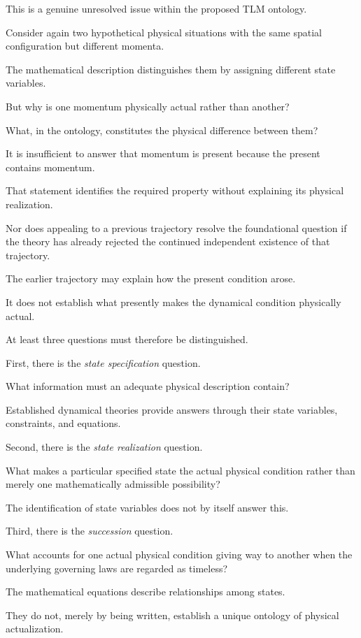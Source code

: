 \documentclass[12pt,onecolumn]{article}
\begin{document}
This is a genuine unresolved issue within the proposed TLM ontology.

Consider again two hypothetical physical situations with the same spatial configuration but different momenta.

The mathematical description distinguishes them by assigning different state variables.

But why is one momentum physically actual rather than another?

What, in the ontology, constitutes the physical difference between them?

It is insufficient to answer that momentum is present because the present contains momentum.

That statement identifies the required property without explaining its physical realization.

Nor does appealing to a previous trajectory resolve the foundational question if the theory has already rejected the continued independent existence of that trajectory.

The earlier trajectory may explain how the present condition arose.

It does not establish what presently makes the dynamical condition physically actual.

At least three questions must therefore be distinguished.

First, there is the \emph{state specification} question.

What information must an adequate physical description contain?

Established dynamical theories provide answers through their state variables, constraints, and equations.

Second, there is the \emph{state realization} question.

What makes a particular specified state the actual physical condition rather than merely one mathematically admissible possibility?

The identification of state variables does not by itself answer this.

Third, there is the \emph{succession} question.

What accounts for one actual physical condition giving way to another when the underlying governing laws are regarded as timeless?

The mathematical equations describe relationships among states.

They do not, merely by being written, establish a unique ontology of physical actualization.
\end{document}
